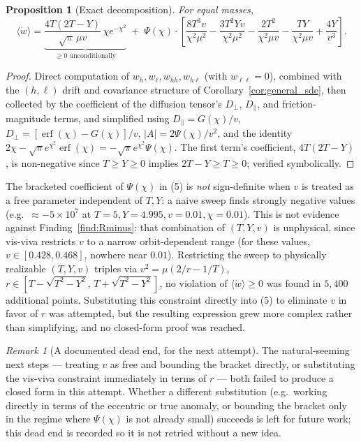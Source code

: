 \documentclass[12pt]{amsart}
\theoremstyle{plain}
\newtheorem{proposition}[theorem]{Proposition}
\theoremstyle{remark}
\newtheorem*{remark}{Remark}
\begin{document}
\begin{proposition}[Exact decomposition]\label{prop:wdecomp}
For equal masses,
\begin{equation}
\langle\dot w\rangle = \underbrace{\frac{4T(2T-Y)}{\sqrt\pi\,\mu v}\,\chi e^{-\chi^2}}_{\geq0\text{ unconditionally}} \;+\; \Psi(\chi)\cdot\left[\frac{8T^3v}{\chi^2\mu^2}-\frac{3T^2Yv}{\chi^2\mu^2}-\frac{2T^2}{\chi^2\mu v}-\frac{TY}{\chi^2\mu v}+\frac{4Y}{v^3}\right]. \tag{5}
\end{equation}
\end{proposition}

\begin{proof}
Direct computation of $w_h,w_\ell,w_{hh},w_{h\ell}$ (with $w_{\ell\ell}=0$), combined with the $(h,\ell)$ drift and covariance structure of Corollary~\ref{cor:general_sde}, then collected by the coefficient of the diffusion tensor's $D_\perp$, $D_\parallel$, and friction-magnitude terms, and simplified using $D_\parallel=G(\chi)/v$, $D_\perp=[\operatorname{erf}(\chi)-G(\chi)]/v$, $|A|=2\Psi(\chi)/v^2$, and the identity $2\chi-\sqrt\pi e^{\chi^2}\operatorname{erf}(\chi)=-\sqrt\pi e^{\chi^2}\Psi(\chi)$. The first term's coefficient, $4T(2T-Y)$, is non-negative since $T\geq Y\geq0$ implies $2T-Y\geq T\geq0$; verified symbolically.
\end{proof}

The bracketed coefficient of $\Psi(\chi)$ in (5) is \emph{not} sign-definite when $v$ is treated as a free parameter independent of $T,Y$: a naive sweep finds strongly negative values (e.g.\ $\approx-5\times10^7$ at $T=5,Y=4.995,v=0.01,\chi=0.01$). This is not evidence against Finding~\ref{find:Rminus}: that combination of $(T,Y,v)$ is unphysical, since vis-viva restricts $v$ to a narrow orbit-dependent range (for these values, $v\in[0.428,0.468]$, nowhere near $0.01$). Restricting the sweep to physically realizable $(T,Y,v)$ triples via $v^2=\mu(2/r-1/T)$, $r\in[T-\sqrt{T^2-Y^2},\,T+\sqrt{T^2-Y^2}]$, no violation of $\langle\dot w\rangle\geq0$ was found in $5{,}400$ additional points. Substituting this constraint directly into (5) to eliminate $v$ in favor of $r$ was attempted, but the resulting expression grew more complex rather than simplifying, and no closed-form proof was reached.

\begin{remark}[A documented dead end, for the next attempt]
The natural-seeming next steps --- treating $v$ as free and bounding the bracket directly, or substituting the vis-viva constraint immediately in terms of $r$ --- both failed to produce a closed form in this attempt. Whether a different substitution (e.g.\ working directly in terms of the eccentric or true anomaly, or bounding the bracket only in the regime where $\Psi(\chi)$ is not already small) succeeds is left for future work; this dead end is recorded so it is not retried without a new idea.
\end{remark}
\end{document}
